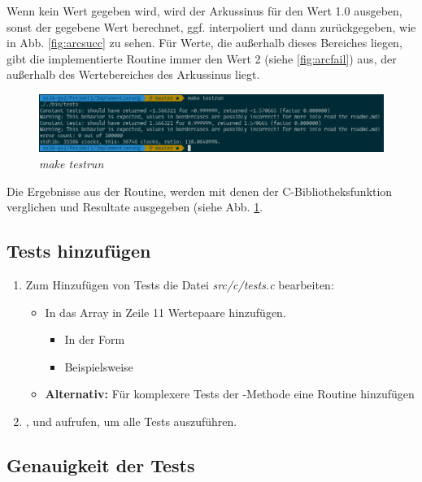 \documentclass{article}
\begin{document}
	Wenn kein Wert gegeben wird, wird der Arkussinus für den Wert 1.0 ausgeben,
	sonst der gegebene Wert berechnet, ggf. interpoliert und dann
	zurückgegeben, wie in Abb. \ref{fig:arcsucc} zu sehen.
	Für Werte, die außerhalb dieses Bereiches liegen, gibt die implementierte
	Routine immer den Wert 2 (siehe \ref{fig:arcfail}) aus,
	der außerhalb des Wertebereiches des Arkussinus liegt.

		\begin{figure}[hb]
			\centering
			\includegraphics[width=1.0\linewidth]{images/testrun}
			\caption{\emph{make testrun}}
			\label{fig:testrun}
		\end{figure}

		Die Ergebnisse aus der Routine, werden mit denen der C-Bibliotheksfunktion verglichen
		und Resultate ausgegeben (siehe Abb. \ref{fig:testrun}.

		\subsection{Tests hinzufügen}
		\begin{enumerate}
			\item Zum Hinzufügen von Tests die Datei \emph{src/c/tests.c} bearbeiten: \begin{itemize}
				\item In das Array  in Zeile 11 Wertepaare hinzufügen. \begin{itemize}
					\item In der Form 
					\item Beispielsweise  \codeword{{[0], [0]}}
				\end{itemize}
				\item \textbf{Alternativ:} Für komplexere Tests der -Methode eine Routine hinzufügen
			\end{itemize}
			\item {},  und  aufrufen, um alle Tests auszuführen.
		\end{enumerate}

	\subsection{Genauigkeit der Tests}
\end{document}
